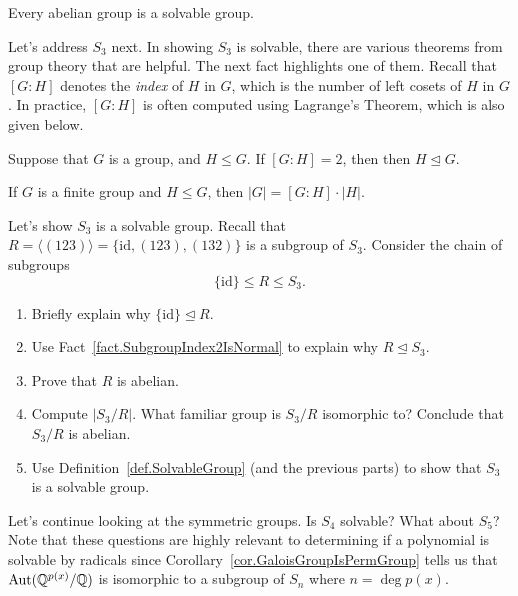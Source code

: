 \begin{theorem}
Every abelian group is a solvable group.
\end{theorem}

Let's address $S_3$ next. In showing $S_3$ is solvable, there are various theorems from group theory that are helpful. The next fact highlights one of them. Recall that $[G:H]$ denotes the \emph{index} of $H$ in $G$, which is the number of left cosets of $H$ in $G$. In practice, $[G:H]$ is often computed using Lagrange's Theorem, which is also given below. 

\begin{fact}\label{fact.SubgroupIndex2IsNormal}
Suppose that $G$ is a group, and $H\le G$. If $[G:H]=2$, then then $H\trianglelefteq G$.
\end{fact}

\begin{fact}\label{thm.Lagrange}
If $G$ is a finite group and $H\le G$, then $|G| = [G:H]\cdot|H|$.
\end{fact}

\begin{problem}
Let's show $S_3$ is a solvable group. Recall that $R = \langle (123)\rangle = \{\text{id},(123),(132)\}$ is a subgroup of $S_3$. Consider the chain of subgroups \[\{\text{id}\} \le R \le S_3.\]
\begin{enumerate}
\item Briefly explain why $\{\text{id}\} \trianglelefteq R$.
\item Use Fact~\ref{fact.SubgroupIndex2IsNormal} to explain why $R\trianglelefteq S_3$.
\item Prove that $R$ is abelian.
\item Compute $|S_3/R|$. What familiar group is  $S_3/R$ isomorphic to? Conclude that $S_3/R$ is abelian.
\item Use Definition~\ref{def.SolvableGroup} (and the previous parts) to show that $S_3$ is a solvable group.
\end{enumerate}
\end{problem}

Let's continue looking at the symmetric groups. Is $S_4$ solvable? What about $S_5$? Note that these  questions are highly relevant to determining if a polynomial is solvable by radicals since Corollary~\ref{cor.GaloisGroupIsPermGroup} tells us that $\operatorname{Aut}(\mathbb{Q}^{p(x)}/\mathbb{Q})$ is isomorphic to a subgroup of $S_n$  where $n = \deg p(x)$.

